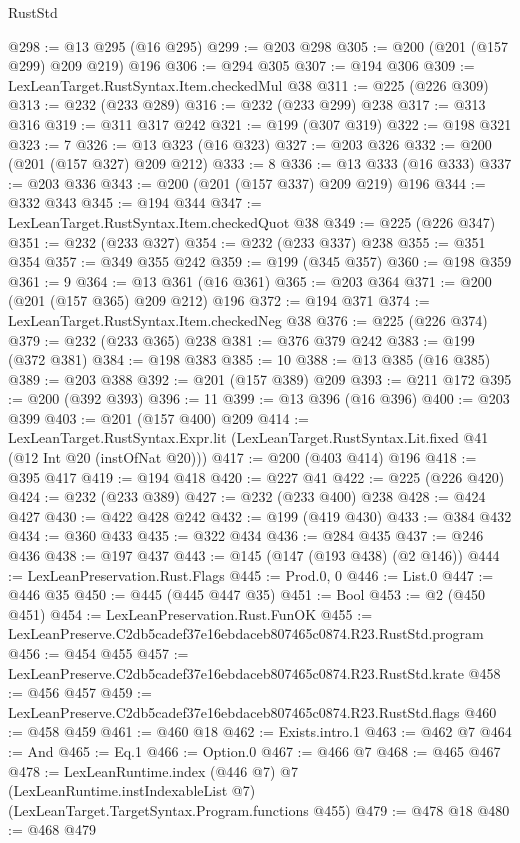 \begin{lexlean}{RustStd}
\begin{coremodule}
@298 := @13 @295 (@16 @295)
@299 := @203 @298
@305 := @200 (@201 (@157 @299) @209 @219) @196
@306 := @294 @305
@307 := @194 @306
@309 := LexLeanTarget.RustSyntax.Item.checkedMul @38
@311 := @225 (@226 @309)
@313 := @232 (@233 @289)
@316 := @232 (@233 @299) @238
@317 := @313 @316
@319 := @311 @317 @242
@321 := @199 (@307 @319)
@322 := @198 @321
@323 := 7
@326 := @13 @323 (@16 @323)
@327 := @203 @326
@332 := @200 (@201 (@157 @327) @209 @212)
@333 := 8
@336 := @13 @333 (@16 @333)
@337 := @203 @336
@343 := @200 (@201 (@157 @337) @209 @219) @196
@344 := @332 @343
@345 := @194 @344
@347 := LexLeanTarget.RustSyntax.Item.checkedQuot @38
@349 := @225 (@226 @347)
@351 := @232 (@233 @327)
@354 := @232 (@233 @337) @238
@355 := @351 @354
@357 := @349 @355 @242
@359 := @199 (@345 @357)
@360 := @198 @359
@361 := 9
@364 := @13 @361 (@16 @361)
@365 := @203 @364
@371 := @200 (@201 (@157 @365) @209 @212) @196
@372 := @194 @371
@374 := LexLeanTarget.RustSyntax.Item.checkedNeg @38
@376 := @225 (@226 @374)
@379 := @232 (@233 @365) @238
@381 := @376 @379 @242
@383 := @199 (@372 @381)
@384 := @198 @383
@385 := 10
@388 := @13 @385 (@16 @385)
@389 := @203 @388
@392 := @201 (@157 @389) @209
@393 := @211 @172
@395 := @200 (@392 @393)
@396 := 11
@399 := @13 @396 (@16 @396)
@400 := @203 @399
@403 := @201 (@157 @400) @209
@414 := LexLeanTarget.RustSyntax.Expr.lit
    (LexLeanTarget.RustSyntax.Lit.fixed @41 (@12 Int @20 (instOfNat @20)))
@417 := @200 (@403 @414) @196
@418 := @395 @417
@419 := @194 @418
@420 := @227 @41
@422 := @225 (@226 @420)
@424 := @232 (@233 @389)
@427 := @232 (@233 @400) @238
@428 := @424 @427
@430 := @422 @428 @242
@432 := @199 (@419 @430)
@433 := @384 @432
@434 := @360 @433
@435 := @322 @434
@436 := @284 @435
@437 := @246 @436
@438 := @197 @437
@443 := @145 (@147 (@193 @438) (@2 @146))
@444 := LexLeanPreservation.Rust.Flags
@445 := Prod.{0, 0}
@446 := List.{0}
@447 := @446 @35
@450 := @445 (@445 @447 @35)
@451 := Bool
@453 := @2 (@450 @451)
@454 := LexLeanPreservation.Rust.FunOK
@455 := LexLeanPreserve.C2db5cadef37e16ebdaceb807465c0874.R23.RustStd.program
@456 := @454 @455
@457 := LexLeanPreserve.C2db5cadef37e16ebdaceb807465c0874.R23.RustStd.krate
@458 := @456 @457
@459 := LexLeanPreserve.C2db5cadef37e16ebdaceb807465c0874.R23.RustStd.flags
@460 := @458 @459
@461 := @460 @18
@462 := Exists.intro.{1}
@463 := @462 @7
@464 := And
@465 := Eq.{1}
@466 := Option.{0}
@467 := @466 @7
@468 := @465 @467
@478 := LexLeanRuntime.index
    (@446 @7)
    @7
    (LexLeanRuntime.instIndexableList @7)
    (LexLeanTarget.TargetSyntax.Program.functions @455)
@479 := @478 @18
@480 := @468 @479

\end{coremodule}
\end{lexlean}
